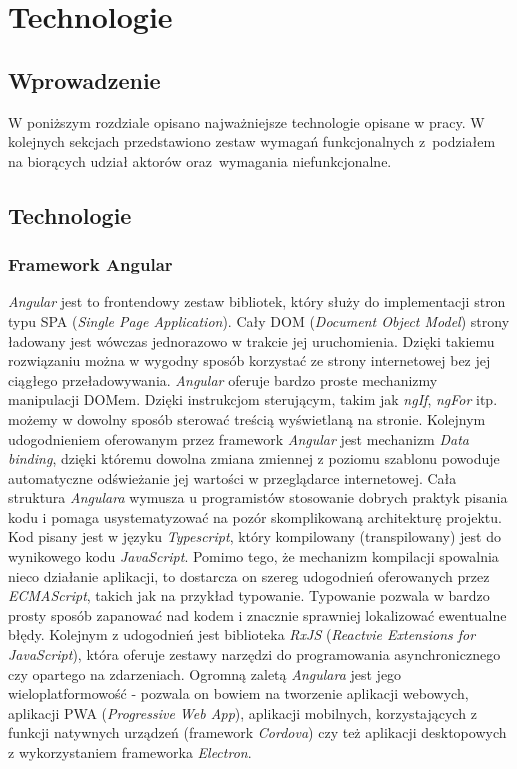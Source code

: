 
\chapter{Technologie}

\section{Wprowadzenie}
W poniższym rozdziale opisano najważniejsze technologie opisane w pracy. W kolejnych sekcjach przedstawiono zestaw wymagań funkcjonalnych z~podziałem na biorących udział aktorów oraz~wymagania niefunkcjonalne.

\section{Technologie}

\subsection{Framework Angular}
\textit{Angular} jest to frontendowy zestaw bibliotek, który służy do implementacji stron typu SPA (\textit{Single Page Application}). Cały DOM (\textit{Document Object Model}) strony ładowany jest wówczas jednorazowo w trakcie jej uruchomienia. Dzięki takiemu rozwiązaniu można w wygodny sposób korzystać ze strony internetowej bez jej ciągłego przeładowywania. \textit{Angular} oferuje bardzo proste mechanizmy manipulacji DOMem. Dzięki instrukcjom sterującym, takim jak \textit{ngIf}, \textit{ngFor} itp. możemy w dowolny sposób sterować treścią wyświetlaną na stronie. Kolejnym udogodnieniem oferowanym przez framework \textit{Angular} jest mechanizm \textit{Data binding}, dzięki któremu dowolna zmiana zmiennej z poziomu szablonu powoduje automatyczne odświeżanie jej wartości w przeglądarce internetowej. Cała struktura \textit{Angulara} wymusza u programistów stosowanie dobrych praktyk pisania kodu i pomaga usystematyzować na pozór skomplikowaną architekturę projektu. Kod pisany jest w języku \textit{Typescript}, który kompilowany (transpilowany) jest do wynikowego kodu \textit{JavaScript}. Pomimo tego, że mechanizm kompilacji spowalnia nieco działanie aplikacji, to dostarcza on szereg udogodnień oferowanych przez \textit{ECMAScript}, takich jak na przykład typowanie. Typowanie pozwala w bardzo prosty sposób zapanować nad kodem i znacznie sprawniej lokalizować ewentualne błędy. Kolejnym z udogodnień jest biblioteka \textit{RxJS} (\textit{Reactvie Extensions for JavaScript}), która oferuje zestawy narzędzi do programowania asynchronicznego czy opartego na zdarzeniach. Ogromną zaletą \textit{Angulara} jest jego wieloplatformowość - pozwala on bowiem na tworzenie aplikacji webowych, aplikacji PWA (\textit{Progressive Web App}), aplikacji mobilnych, korzystających z funkcji natywnych urządzeń (framework \textit{Cordova}) czy też aplikacji desktopowych z wykorzystaniem frameworka \textit{Electron}. \cite{Angular}
 
